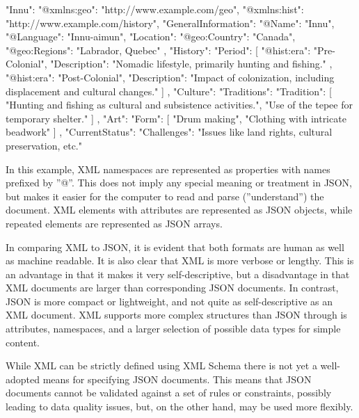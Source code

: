\begin{samepage}
\begin{jsoncode}
"Innu": {
	"@xmlns:geo": "http://www.example.com/geo",
	"@xmlns:hist": "http://www.example.com/history",
	"GeneralInformation": {
		"@Name": "Innu",
		"@Language": "Innu-aimun",
		"Location": {
			"@geo:Country": "Canada",
			"@geo:Regions": "Labrador, Quebec"
		}
	},
	"History": {
		"Period": [
			{
				"@hist:era": "Pre-Colonial",
				"Description": "Nomadic lifestyle, 
				     primarily hunting and fishing."
			},
			{
				"@hist:era": "Post-Colonial",
				"Description": "Impact of colonization, 
				     including displacement and 
				     cultural changes."
			}
		]
	},
	"Culture": {
		"Traditions": {
			"Tradition": [
				"Hunting and fishing as cultural and 
				     subsistence activities.",
				"Use of the tepee for temporary shelter."
			]
		},
		"Art": {
			"Form": [
				"Drum making",
				"Clothing with intricate beadwork"
			]
		}
	},
	"CurrentStatus": {
		"Challenges": "Issues like land rights, 
		     cultural preservation, etc."
	}
}
\end{jsoncode}
\end{samepage}

In this example, XML namespaces are represented as properties with names prefixed by ''@''. This does not imply any special meaning or treatment in JSON, but makes it easier for the computer to read and parse (''understand'') the document. XML elements with attributes are represented as JSON objects, while repeated elements are represented as JSON arrays. 

In comparing XML to JSON, it is evident that both formats are human as well as machine readable. It is also clear that XML is more verbose or lengthy. This is an advantage in that it makes it very self-descriptive, but a disadvantage in that XML documents are larger than corresponding JSON documents. In contrast, JSON is more compact or lightweight, and not quite as self-descriptive as an XML document. XML supports more complex structures than JSON through is attributes, namespaces, and a larger selection of possible data types for simple content. 

While XML can be strictly defined using XML Schema there is not yet a well-adopted means for specifying JSON documents. This means that JSON documents cannot be validated against a set of rules or constraints, possibly leading to data quality issues, but, on the other hand, may be used more flexibly.

